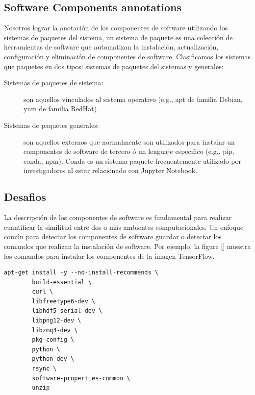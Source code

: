 \subsection{Software Components annotations}\label{s4.2.2}


Nosotros lograr la anotación de los componentes de software utilizando los sistemas de paquetes del sistema, un sistema de paquete es una colección de herramientas de software que automatizan la instalación, actualización, configuración y eliminación de componentes de software. 
Clasificamos los sistemas que paquetes en dos tipos: sistemas de paquetes del sistemas y generales:

\begin{description}
	\item  [Sistemas de paquetes de sistema:] son aquellos vinculados al sistema operativo (e.g., apt de familia Debian, yum de familia RedHat).
	\item [Sistemas de paquetes generales:] son aquellos externos que normalmente son utilizados para instalar un componentes de software de tercero ó un lenguaje especifico (e.g., pip, conda, npm). Conda es un sistema paquete frecuentemente utilizado por investigadores al estar relacionado con Jupyter Notebook.

\end{description}


\subsection{Desafios}\label{s4.2.2}

La descripción de los componentes de software es fundamental para realizar cuantificar la similitud entre dos o más ambientes computacionales.
Un enfoque común para detectar los componentes de software guardar o detectar los comandos que realizan la instalación de software. Por ejemplo, la figure \ref{} muestra los comandos para instalar los componentes de la imagen TensorFlow. 


\begin{lstlisting}
apt-get install -y --no-install-recommends \
        build-essential \
        curl \
        libfreetype6-dev \
        libhdf5-serial-dev \
        libpng12-dev \
        libzmq3-dev \
        pkg-config \
        python \
        python-dev \
        rsync \
        software-properties-common \
        unzip	
\end{lstlisting}

